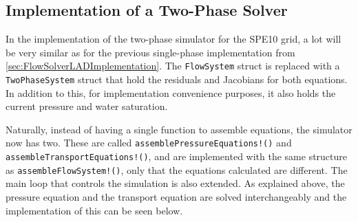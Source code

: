 \subsection{Implementation of a Two-Phase Solver}
In the implementation of the two-phase simulator for the SPE10 grid, a lot will be very similar as for the previous single-phase implementation from \autoref{sec:FlowSolverLADImplementation}. The \texttt{FlowSystem} struct is replaced with a \texttt{TwoPhaseSystem} struct that hold the residuals and Jacobians for both equations. In addition to this, for implementation convenience purposes, it also holds the current pressure and water saturation.

Naturally, instead of having a single function to assemble equations, the simulator now has two. These are called \texttt{assemblePressureEquations!()} and \texttt{assembleTransportEquations!()}, and are implemented with the same structure as \texttt{assembleFlowSystem!()}, only that the equations calculated are different. The main loop that controls the simulation is also extended. As explained above, the pressure equation and the transport equation are solved interchangeably and the implementation of this can be seen below.



